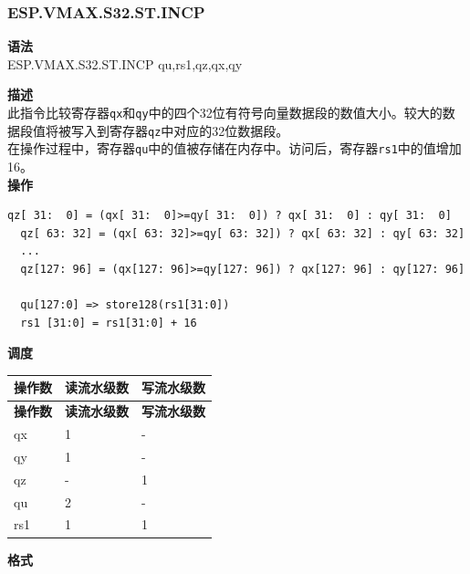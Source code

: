 \newpage

\newpage
\subsubsection{ESP.VMAX.S32.ST.INCP}\label{instruction:ESPVMAXS32STINCP}
\textbf{语法}\\
ESP.VMAX.S32.ST.INCP qu,rs1,qz,qx,qy

\textbf{描述}\\
此指令比较寄存器\lstinline{qx}和\lstinline{qy}中的四个32位有符号向量数据段的数值大小。较大的数据段值将被写入到寄存器\lstinline{qz}中对应的32位数据段。\\在操作过程中，寄存器\lstinline{qu}中的值被存储在内存中。访问后，寄存器\lstinline{rs1}中的值增加16。\\
\textbf{操作}
\begin{lstlisting}[escapeinside=`?]
  qz[ 31:  0] = (qx[ 31:  0]>=qy[ 31:  0]) ? qx[ 31:  0] : qy[ 31:  0]
  qz[ 63: 32] = (qx[ 63: 32]>=qy[ 63: 32]) ? qx[ 63: 32] : qy[ 63: 32]
  ...
  qz[127: 96] = (qx[127: 96]>=qy[127: 96]) ? qx[127: 96] : qy[127: 96]

  qu[127:0] => store128(rs1[31:0])
  rs1 [31:0] = rs1[31:0] + 16
\end{lstlisting}

\textbf{调度}\\
\begin{longtable}[c]{|l|l|l|}
    \hline
    \rowcolor{lightgray}
    \textbf{操作数} & \textbf{读流水级数} & \textbf{写流水级数} \\\hline
    \endfirsthead
    \hline
    \rowcolor{lightgray}
     \textbf{操作数} & \textbf{读流水级数} & \textbf{写流水级数} \\\hline
    \endhead
    \hline
    \endfoot

    qx & 1 & - \\\hline
  qy & 1 & - \\\hline
     qz & - & 1 \\\hline
     qu & 2 & - \\\hline
     rs1 & 1 & 1

\end{longtable}

\textbf{格式}\\

